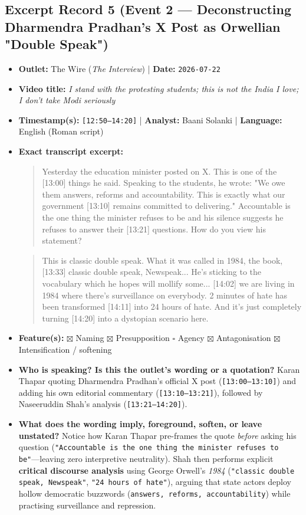 \documentclass[10pt,a4paper]{article}
\begin{document}
\subsection*{Excerpt Record 5 (Event 2 --- Deconstructing Dharmendra Pradhan's X Post as Orwellian "Double Speak")}
\begin{itemize}[leftmargin=1.5em, itemsep=3pt, topsep=4pt]
  \item \textbf{Outlet:} The Wire (\textit{The Interview}) | \textbf{Date:} \texttt{2026-07-22}
  \item \textbf{Video title:} \textit{I stand with the protesting students; this is not the India I love; I don't take Modi seriously}
  \item \textbf{Timestamp(s):} \texttt{[12:50--14:20]} | \textbf{Analyst:} Baani Solanki | \textbf{Language:} English (Roman script)
  \item \textbf{Exact transcript excerpt:}
    \begin{quote}\small{} Yesterday the education minister posted on X. This is one of the [13:00] things he said. Speaking to the students, he wrote: "We owe them answers, reforms and accountability. This is exactly what our government [13:10] remains committed to delivering." Accountable is the one thing the minister refuses to be and his silence suggests he refuses to answer their [13:21] questions. How do you view his statement?\end{quote}
    \begin{quote}\small{} This is classic double speak. What it was called in 1984, the book, [13:33] classic double speak, Newspeak... He's sticking to the vocabulary which he hopes will mollify some... [14:02] we are living in 1984 where there's surveillance on everybody. 2 minutes of hate has been transformed [14:11] into 24 hours of hate. And it's just completely turning [14:20] into a dystopian scenario here.\end{quote}
  \item \textbf{Feature(s):} $\boxtimes$ Naming $\boxtimes$ Presupposition $\square$ Agency $\boxtimes$ Antagonisation $\boxtimes$ Intensification / softening
  \item \textbf{Who is speaking? Is this the outlet's wording or a quotation?} Karan Thapar quoting Dharmendra Pradhan's official X post (\texttt{[13:00--13:10]}) and adding his own editorial commentary (\texttt{[13:10--13:21]}), followed by Naseeruddin Shah's analysis (\texttt{[13:21--14:20]}).
  \item \textbf{What does the wording imply, foreground, soften, or leave unstated?} Notice how Karan Thapar pre-frames the quote \textit{before} asking his question (\texttt{"Accountable is the one thing the minister refuses to be"}---leaving zero interpretive neutrality). Shah then performs explicit \textbf{critical discourse analysis} using George Orwell's \textit{1984} (\texttt{"classic double speak, Newspeak"}, \texttt{"24 hours of hate"}), arguing that state actors deploy hollow democratic buzzwords (\texttt{answers, reforms, accountability}) while practising surveillance and repression.

\end{itemize}
\end{document}
